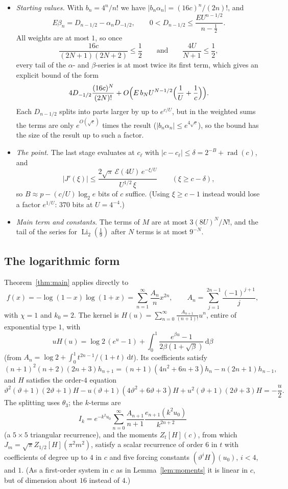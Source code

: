 \documentclass[11pt]{amsart}
\theoremstyle{definition}
\theoremstyle{remark}
\newcommand{\Eip}{\mathcal{E}}
\newcommand{\Li}{\operatorname{Li}}
\newcommand{\dd}{\,\mathrm{d}}
\begin{document}
\begin{itemize}
\item \emph{Starting values.} With $b_n = 4^n/n!$ we have $|b_n\alpha_n| = (16c)^n/(2n)!$, and
\[
  E\beta_n = D_{n-1/2} - \alpha_nD_{-1/2}, \qquad 0 < D_{n-1/2} \le \frac{EU^{n-1/2}}{n-\frac12}.
\]
All weights are at most $1$, so once
\[
  \frac{16c}{(2N+1)(2N+2)} \le \frac12 \qquad\text{and}\qquad \frac{4U}{N+1} \le \frac12,
\]
every tail of the $\alpha$- and
$\beta$-series is at most twice its first term, which gives an explicit bound of the form
\[
  4D_{-1/2}\frac{(16c)^N}{(2N)!} + O\Bigl(E\,b_NU^{N-1/2}\Bigl(\frac1U + \frac1c\Bigr)\Bigr).
\]
Each $D_{n-1/2}$ splits into parts larger by up to $e^{c/U}$, but in the weighted sums the terms are only
$e^{O(\sqrt c)}$ times the result ($|b_n\alpha_n| \le e^{4\sqrt c}$), so the bound has the size of the result up to such a factor.
\item \emph{The point.} The last stage evaluates at $c_\ell$ with $|c - c_\ell| \le \delta = 2^{-B} + \operatorname{rad}(c)$, and
\[
  |J'(\xi)| \le \frac{2\sqrt\pi\,\Eip(4U)\,e^{-\xi/U}}{U^{1/2}\,\xi} \qquad (\xi \ge c - \delta),
\]
so $B \approx p - (c/U)\log_2e$ bits of $c$ suffice. (Using $\xi \ge c - 1$ instead would lose a factor
$e^{1/U}$: $370$ bits at $U = 4^{-4}$.)
\item \emph{Main term and constants.} The terms of $M$ are at most $3(8U)^N/N!$, and the tail of the series for
$\Li_2(\frac19)$ after $N$ terms is at most $9^{-N}$.
\end{itemize}

\subsection{The logarithmic form}\label{sec:logform}
Theorem~\ref{thm:main} applies directly to
\[
  f(x) = -\log(1-x)\log(1+x) = \sum_{n=1}^{\infty}\frac{A_n}{n}x^{2n}, \qquad A_n = \sum_{j=1}^{2n-1}\frac{(-1)^{j+1}}j,
\]
with $\chi = 1$ and $k_0 = 2$. The kernel is $H(u) = \sum_{n=0}^{\infty}\frac{A_{n+1}}{(n+1)!}u^n$, entire of exponential
type $1$, with
\[
  uH(u) = \log 2\,(e^u-1) + \int_0^1\frac{e^{\beta u}-1}{2\beta(1+\sqrt\beta)}\dd\beta
\]
(from $A_n = \log 2 + \int_0^1 t^{2n-1}/(1+t)\dd t$). Its coefficients satisfy
\[
  (n+1)^2(n+2)(2n+3)h_{n+1} = (n+1)(4n^2+6n+3)h_n - n(2n+1)h_{n-1},
\]
and $H$ satisfies the order-$4$ equation
\[
  \vartheta^2(\vartheta+1)(2\vartheta+1)H - u(\vartheta+1)(4\vartheta^2+6\vartheta+3)H
  + u^2(\vartheta+1)(2\vartheta+3)H = -\frac u2.
\]
The splitting uses $\theta_3$; the $k$-terms are
\[
  I_k = e^{-k^2u_0}\sum_{n=0}^{\infty}\frac{A_{n+1}}{n+1}\frac{e_{n+1}(k^2u_0)}{k^{2n+2}}
\]
(a $5\times5$ triangular recurrence), and the moments $Z_t[H](c)$, from which $J_m = \sqrt\pi Z_{1/2}[H](\pi^2m^2)$,
satisfy a scalar
recurrence of order $6$ in $t$ with coefficients of degree up to $4$ in $c$ and five forcing constants
$(\vartheta^iH)(u_0)$, $i < 4$, and $1$. (As a first-order system in $c$ as in Lemma~\ref{lem:moments} it is linear in $c$,
but of dimension about $16$ instead of $4$.)
\end{document}
